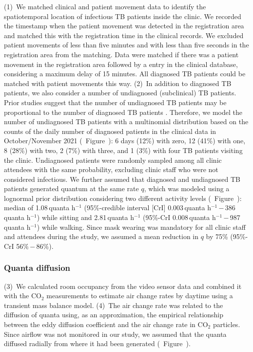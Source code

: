 \documentclass[fleqn,11pt]{wlscirep}
\begin{document}
(1)~We matched clinical and patient movement data to identify the spatiotemporal location of infectious TB patients inside the clinic. We recorded the timestamp when the patient movement was detected in the registration area and matched this with the registration time in the clinical records. We excluded patient movements of less than five minutes and with less than five seconds in the registration area from the matching. Data were matched if there was a patient movement in the registration area followed by a entry in the clinical database, considering a maximum delay of 15 minutes. All diagnosed TB patients could be matched with patient movements this way. (2)~In addition to diagnosed TB patients, we also consider a number of undiagnosed (subclinical) TB patients. Prior studies suggest that the number of undiagnosed TB patients may be proportional to the number of diagnosed TB patients \cite{Berhanu2023CID,Moyo2022LancetID,Patterson2024PNAS}. Therefore, we model the number of undiagnosed TB patients with a multinomial distribution based on the counts of the daily number of diagnosed patients in the clinical data in October/November 2021 (\supp~Figure~): 6 days (12\%) with zero, 12 (41\%) with one, 8 (28\%) with two, 2 (7\%) with three, and 1 (3\%) with four TB patients visiting the clinic. Undiagnosed patients were randomly sampled among all clinic attendees with the same probability, excluding clinic staff who were not considered infectious. We further assumed that diagnosed and undiagnosed TB patients generated quantum at the same rate $q$, which was modeled using a lognormal prior distribution considering two different activity levels (\supp~Figure~): median of 1.08\,quanta h$^{-1}$ (95\%-credible interval [CrI] 0.003\,quanta h$^{-1}$\,$-$\,386\,quanta h$^{-1}$) while sitting and 2.81\,quanta h$^{-1}$ (95\%-CrI 0.008\,quanta h$^{-1}$\,$-$\,987\,quanta h$^{-1}$) while walking\cite{Mikszewski2021GF,Buonanno2020EI,Banholzer2024PGPH}. Since mask wearing was mandatory for all clinic staff and attendees during the study, we assumed a mean reduction in $q$ by 75\% (95\%-CrI 56\%\,$-$\,86\%)\cite{Dharmadhikari2012AJRCCM,McCreesh2021BMJGlobalHealth}.

\subsubsection*{Quanta diffusion}

(3)~We calculated room occupancy from the video sensor data and combined it with the CO$_2$ measurements to estimate air change rates by daytime using a transient mass balance model\cite{Batterman2017IJERPH}. (4)~The air change rate was related to the diffusion of quanta using, as an approximation, the empirical relationship between the eddy diffusion coefficient and the air change rate in CO$_2$ particles\cite{Cheng2011EnvSciTech,Foat2020BE}. Since airflow was not monitored in our study, we assumed that the quanta diffused radially from where it had been generated (\supp~Figure~). 
\end{document}
